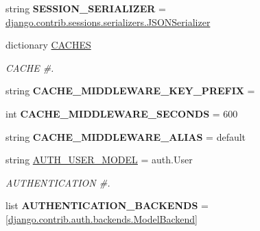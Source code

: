\begin{DoxyCompactItemize}
string {\bfseries S\+E\+S\+S\+I\+O\+N\+\_\+\+S\+E\+R\+I\+A\+L\+I\+Z\+ER} = \textquotesingle{}\mbox{\hyperlink{classdjango_1_1core_1_1signing_1_1_j_s_o_n_serializer}{django.\+contrib.\+sessions.\+serializers.\+J\+S\+O\+N\+Serializer}}\textquotesingle{}
\item 
dictionary \mbox{\hyperlink{namespacedjango_1_1conf_1_1global__settings_ae7cf5d4688ad56d461a711a0cecb1579}{C\+A\+C\+H\+ES}}
\begin{DoxyCompactList}\small\item\em C\+A\+C\+HE \#. \end{DoxyCompactList}\item 
\mbox{\label{namespacedjango_1_1conf_1_1global__settings_a7609f83b716e38ee08709f942e4cf2a4}} 
string {\bfseries C\+A\+C\+H\+E\+\_\+\+M\+I\+D\+D\+L\+E\+W\+A\+R\+E\+\_\+\+K\+E\+Y\+\_\+\+P\+R\+E\+F\+IX} = \textquotesingle{}\textquotesingle{}
\item 
\mbox{\label{namespacedjango_1_1conf_1_1global__settings_a940d3dab21e00c3e505c0b32e63fe613}} 
int {\bfseries C\+A\+C\+H\+E\+\_\+\+M\+I\+D\+D\+L\+E\+W\+A\+R\+E\+\_\+\+S\+E\+C\+O\+N\+DS} = 600
\item 
\mbox{\label{namespacedjango_1_1conf_1_1global__settings_a8e422004b4085e9d39163b006327c3ab}} 
string {\bfseries C\+A\+C\+H\+E\+\_\+\+M\+I\+D\+D\+L\+E\+W\+A\+R\+E\+\_\+\+A\+L\+I\+AS} = \textquotesingle{}default\textquotesingle{}
\item 
\mbox{\label{namespacedjango_1_1conf_1_1global__settings_a8b30665ed51eb6822f3b7c946d08d050}} 
string \mbox{\hyperlink{namespacedjango_1_1conf_1_1global__settings_a8b30665ed51eb6822f3b7c946d08d050}{A\+U\+T\+H\+\_\+\+U\+S\+E\+R\+\_\+\+M\+O\+D\+EL}} = \textquotesingle{}auth.\+User\textquotesingle{}
\begin{DoxyCompactList}\small\item\em A\+U\+T\+H\+E\+N\+T\+I\+C\+A\+T\+I\+ON \#. \end{DoxyCompactList}\item 
\mbox{\label{namespacedjango_1_1conf_1_1global__settings_aa779f76265b08eeaea4fdc2964c1f2e1}} 
list {\bfseries A\+U\+T\+H\+E\+N\+T\+I\+C\+A\+T\+I\+O\+N\+\_\+\+B\+A\+C\+K\+E\+N\+DS} = \mbox{[}\textquotesingle{}\mbox{\hyperlink{classdjango_1_1contrib_1_1auth_1_1backends_1_1_model_backend}{django.\+contrib.\+auth.\+backends.\+Model\+Backend}}\textquotesingle{}\mbox{]}

\end{DoxyCompactItemize}
